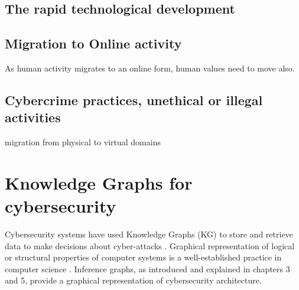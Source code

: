 \subsection {The rapid technological development}

\subsection  {Migration to Online activity}

As human activity migrates to an online form, human values need to move also.
 
\subsection {Cybercrime practices, unethical or illegal activities}

migration from physical to virtual domains



\section{Knowledge Graphs for cybersecurity}
Cybersecurity systems have used Knowledge Graphs (KG) to store and  retrieve data  to make decisions about cyber-attacks 
\iffalse 
We believe that improving the base cyber threat intelligence representation will help improve the overall quality and performance of systems. The dependence of various cybersecurity informatics systems on various knowledge representation schemes makes it imperative that we develop systems that improve these representations. In some cases, a knowledge graph can have incorrect relationships between two cybersecurity entities, or may not even assert a relationship or a few missing relationships. In such a case, we can say that there are a few missing of relationships. we improve knowledge graphs by validating relationships and asserting values for missing relationships \fi \cite{pingle2019relext,jia2018practical, ghose2019multimodal, deng2019knowledge}. Graphical representation of logical or structural properties of computer systems is a well-established practice in computer science \cite{engelen2010integrating}. Inference graphs, as introduced and explained in chapters 3 and 5, provide a graphical representation of cybersecurity architecture.



